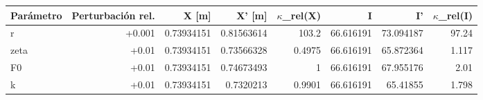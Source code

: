 {\footnotesize
\begin{longtable}{lrrrrrrr}
\toprule
\textbf{Parámetro} & \textbf{Perturbación rel.} & \textbf{X [m]} & \textbf{X' [m]} & \textbf{$\kappa$\_rel(X)} & \textbf{I} & \textbf{I'} & \textbf{$\kappa$\_rel(I)} \\
\midrule
\endhead
r & +0.001 & 0.73934151 & 0.81563614 & 103.2 & 66.616191 & 73.094187 & 97.24 \\
zeta & +0.01 & 0.73934151 & 0.73566328 & 0.4975 & 66.616191 & 65.872364 & 1.117 \\
F0 & +0.01 & 0.73934151 & 0.74673493 & 1 & 66.616191 & 67.955176 & 2.01 \\
k & +0.01 & 0.73934151 & 0.7320213 & 0.9901 & 66.616191 & 65.41855 & 1.798 \\
\bottomrule
\end{longtable}
}
